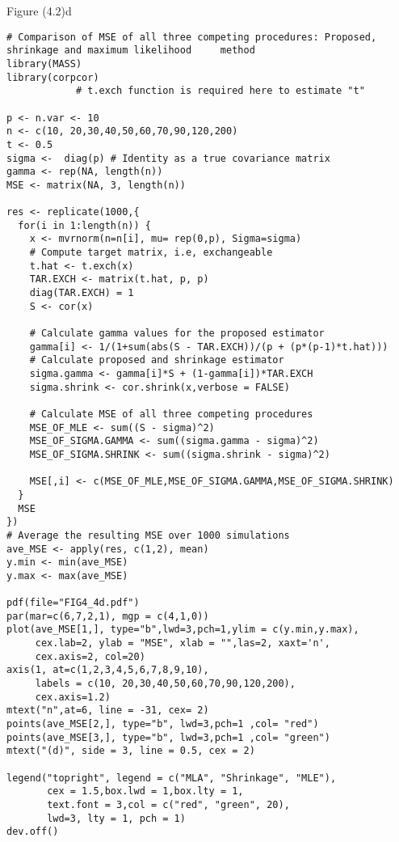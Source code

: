 Figure (4.2)d
\begin{lstlisting}
# Comparison of MSE of all three competing procedures: Proposed, shrinkage and maximum likelihood     method
library(MASS)
library(corpcor)
            # t.exch function is required here to estimate "t"

p <- n.var <- 10
n <- c(10, 20,30,40,50,60,70,90,120,200)
t <- 0.5
sigma <-  diag(p) # Identity as a true covariance matrix
gamma <- rep(NA, length(n))
MSE <- matrix(NA, 3, length(n))

res <- replicate(1000,{
  for(i in 1:length(n)) {
    x <- mvrnorm(n=n[i], mu= rep(0,p), Sigma=sigma)
    # Compute target matrix, i.e, exchangeable
    t.hat <- t.exch(x)
    TAR.EXCH <- matrix(t.hat, p, p)
    diag(TAR.EXCH) = 1
    S <- cor(x)
    
    # Calculate gamma values for the proposed estimator
    gamma[i] <- 1/(1+sum(abs(S - TAR.EXCH))/(p + (p*(p-1)*t.hat)))
    # Calculate proposed and shrinkage estimator
    sigma.gamma <- gamma[i]*S + (1-gamma[i])*TAR.EXCH
    sigma.shrink <- cor.shrink(x,verbose = FALSE)
    
    # Calculate MSE of all three competing procedures
    MSE_OF_MLE <- sum((S - sigma)^2)
    MSE_OF_SIGMA.GAMMA <- sum((sigma.gamma - sigma)^2)
    MSE_OF_SIGMA.SHRINK <- sum((sigma.shrink - sigma)^2)
    
    MSE[,i] <- c(MSE_OF_MLE,MSE_OF_SIGMA.GAMMA,MSE_OF_SIGMA.SHRINK)
  }
  MSE
})
# Average the resulting MSE over 1000 simulations
ave_MSE <- apply(res, c(1,2), mean)
y.min <- min(ave_MSE)
y.max <- max(ave_MSE)

pdf(file="FIG4_4d.pdf")
par(mar=c(6,7,2,1), mgp = c(4,1,0))
plot(ave_MSE[1,], type="b",lwd=3,pch=1,ylim = c(y.min,y.max),
     cex.lab=2, ylab = "MSE", xlab = "",las=2, xaxt='n',
     cex.axis=2, col=20)
axis(1, at=c(1,2,3,4,5,6,7,8,9,10),
     labels = c(10, 20,30,40,50,60,70,90,120,200),
     cex.axis=1.2)
mtext("n",at=6, line = -31, cex= 2)
points(ave_MSE[2,], type="b", lwd=3,pch=1 ,col= "red")
points(ave_MSE[3,], type="b", lwd=3,pch=1 ,col= "green")
mtext("(d)", side = 3, line = 0.5, cex = 2)

legend("topright", legend = c("MLA", "Shrinkage", "MLE"),
       cex = 1.5,box.lwd = 1,box.lty = 1,
       text.font = 3,col = c("red", "green", 20),
       lwd=3, lty = 1, pch = 1)
dev.off()
\end{lstlisting}

